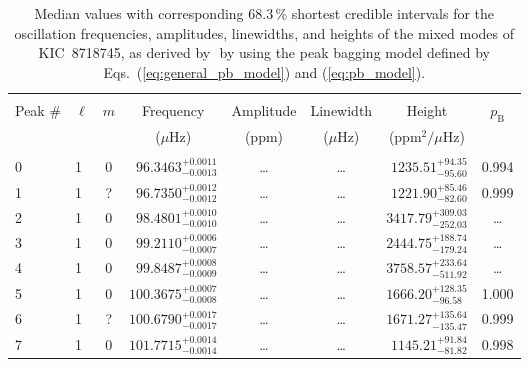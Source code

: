 \begin{table*}[!]
\caption{Median values with corresponding 68.3\,\% shortest credible intervals for the oscillation frequencies, amplitudes, linewidths, and heights of the mixed modes of KIC~8718745, as derived by \diamonds\,\,by using the peak bagging model defined by Eqs.~(\ref{eq:general_pb_model}) and (\ref{eq:pb_model}).}
\label{tab:8718745m}
\centering
\begin{tabular}{llcrrlrc}
\hline\hline
\\[-8pt]      
Peak \# & $\ell$ & $m$ & \multicolumn{1}{c}{Frequency} & \multicolumn{1}{c}{Amplitude} & \multicolumn{1}{c}{Linewidth} & \multicolumn{1}{c}{Height}& $p_\mathrm{B}$\\
 & & & \multicolumn{1}{c}{($\mu$Hz)} & \multicolumn{1}{c}{(ppm)} & \multicolumn{1}{c}{($\mu$Hz)} & \multicolumn{1}{c}{(ppm$^2/\mu$Hz)}\\
\hline \\[-8pt]

0 & 1 & 0 & $     96.3463_{-      0.0013}^{+      0.0011}$ & \multicolumn{1}{c}{\dots} & \multicolumn{1}{c}{\dots} & $     1235.51_{-       95.60}^{+       94.35}$ & 0.994\\[1pt]
1 & 1 & ? & $     96.7350_{-      0.0012}^{+      0.0012}$ & \multicolumn{1}{c}{\dots} & \multicolumn{1}{c}{\dots} & $     1221.90_{-       82.60}^{+       85.46}$  & 0.999\\[1pt]
2 & 1 & 0 & $     98.4801_{-      0.0010}^{+      0.0010}$ & \multicolumn{1}{c}{\dots} & \multicolumn{1}{c}{\dots} & $     3417.79_{-      252.03}^{+      309.03}$ & \dots \\[1pt]
3 & 1 & 0 & $     99.2110_{-      0.0007}^{+      0.0006}$ & \multicolumn{1}{c}{\dots} & \multicolumn{1}{c}{\dots} & $     2444.75_{-      179.24}^{+      188.74}$ & \dots \\[1pt]
4 & 1 & 0 & $     99.8487_{-      0.0009}^{+      0.0008}$ & \multicolumn{1}{c}{\dots} & \multicolumn{1}{c}{\dots} & $     3758.57_{-      511.92}^{+      233.64}$ & \dots \\[1pt]
5 & 1 & 0 & $    100.3675_{-      0.0008}^{+      0.0007}$ & \multicolumn{1}{c}{\dots} & \multicolumn{1}{c}{\dots} & $     1666.20_{-       96.58}^{+      128.35}$ & 1.000\\[1pt]
6 & 1 & ? & $    100.6790_{-      0.0017}^{+      0.0017}$ & \multicolumn{1}{c}{\dots} & \multicolumn{1}{c}{\dots} & $     1671.27_{-      135.47}^{+      135.64}$ & 0.999\\[1pt]
7 & 1 & 0 & $    101.7715_{-      0.0014}^{+      0.0014}$ & \multicolumn{1}{c}{\dots} & \multicolumn{1}{c}{\dots} & $     1145.21_{-       81.82}^{+       91.84}$ & 0.998\\[1pt]


\end{tabular}
\end{table*}
